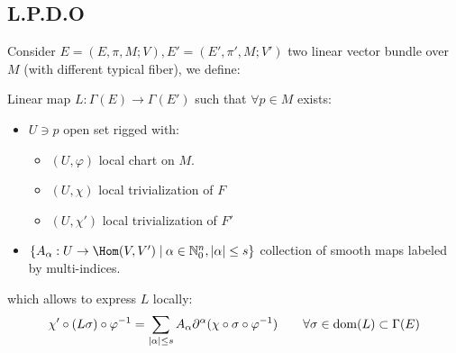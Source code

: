 \documentclass[a4paper,12pt]{scrartcl}    %
\begin{document}
	\subsection{L.P.D.O}
		Consider $E=(E,\pi,M;V), E'=(E',\pi',M;V')$ two linear vector bundle over $M$ (with different typical fiber), we define:
		\begin{definition}\label{Def:LPDO}
			Linear map $L:\Gamma(E)\rightarrow \Gamma(E')$ such that $\forall p \in M$ exists:
		\begin{itemize}
			\item $U \ni p$ open set rigged with:
				\begin{itemize}
					\item $(U, \varphi )$ local chart on $M$.
					\item $(U, \chi)$ local trivialization of $F$
					\item $(U, \chi')$ local trivialization of $F'$
				\end{itemize}
			\item $\{A_\alpha :U \rightarrow \Hom(V,V')\; \vert \: \alpha \in \Natural_0^n, \vert \alpha \vert \leq s \}$ collection of smooth maps labeled by multi-indices.
		\end{itemize}
		which allows to express $L$ locally:
		\begin{displaymath}
			\chi' \circ ( L \sigma) \circ \varphi^{-1} =
			\sum_{\vert \alpha \vert \leq s} A_\alpha \partial^\alpha (\chi \circ \sigma \circ \varphi^{-1} ) 
			\qquad \forall \sigma \in \mathrm{dom}(L) \subset \Gamma(E)
		\end{displaymath}
	\end{definition}
	
\end{document}
